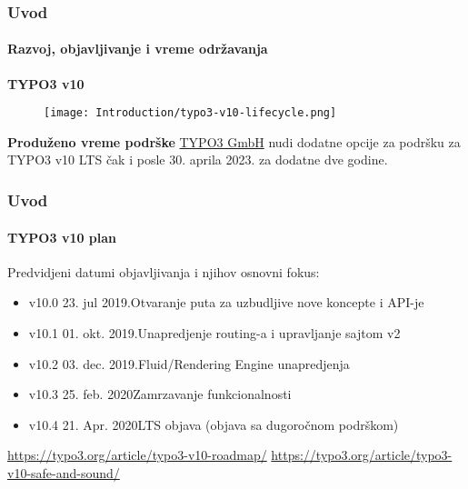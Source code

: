 
\begin{frame}[fragile]
	\frametitle{Uvod}
	\framesubtitle{Razvoj, objavljivanje i vreme održavanja}

	\textbf{TYPO3 v10}

	\begin{figure}
		\texttt{[image: Introduction/typo3-v10-lifecycle.png]}
	\end{figure}

	\textbf{Produženo vreme podrške}\newline
	\smaller
		\href{https://typo3.com}{TYPO3 GmbH} nudi dodatne opcije za podršku za
		TYPO3 v10 LTS čak i posle 30. aprila 2023. za dodatne dve godine.
	\normalsize

\end{frame}


\begin{frame}[fragile]
	\frametitle{Uvod}
	\framesubtitle{TYPO3 v10 plan}

	Predvidjeni datumi objavljivanja i njihov osnovni fokus:

	\begin{itemize}

		\item v10.0 \tabto{1.1cm}23. jul 2019.\tabto{3.4cm}Otvaranje puta za uzbudljive nove koncepte i API-je
		\item v10.1 \tabto{1.1cm}01. okt. 2019.\tabto{3.4cm}Unapredjenje routing-a i upravljanje sajtom v2
		\item v10.2 \tabto{1.1cm}03. dec. 2019.\tabto{3.4cm}Fluid/Rendering Engine unapredjenja
		\item
			\begingroup
				\color{typo3orange}
				v10.3 \tabto{1.1cm}25. feb. 2020\tabto{3.4cm}Zamrzavanje funkcionalnosti
			\endgroup
		\item v10.4 \tabto{1.1cm}21. Apr. 2020\tabto{3.4cm}LTS objava (objava sa dugoročnom podrškom)

	\end{itemize}

	\vspace{0.6cm}
	\smaller
		\url{https://typo3.org/article/typo3-v10-roadmap/}\newline
		\url{https://typo3.org/article/typo3-v10-safe-and-sound/}
	\normalsize

\end{frame}

